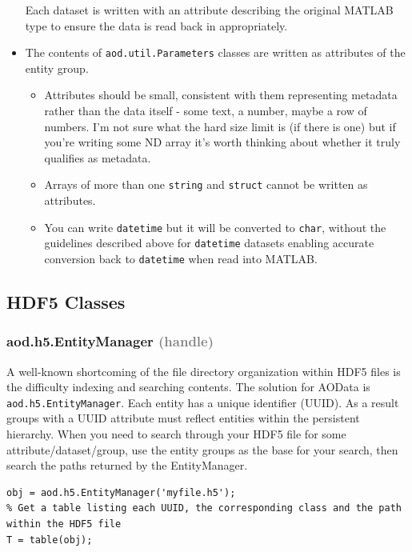 \documentclass[10pt]{exam}
\newcommand\myparent[1]{\textcolor{gray}{(#1)}}
\newcommand\aodclass[1]{\textcolor{codeblue}{\texttt{#1}}}
\newcommand\matclass[1]{\textcolor{codeblue}{\texttt{#1}}}
\begin{document}
\begin{itemize}
\begin{itemize}
			\end{itemize}
			Each dataset is written with an attribute describing the original MATLAB type to ensure the data is read back in appropriately.
			\item The contents of \aodclass{aod.util.Parameters} classes are written as attributes of the entity group.
			\begin{itemize}
				\item Attributes should be small, consistent with them representing metadata rather than the data itself - some text, a number, maybe a row of numbers. I'm not sure what the hard size limit is (if there is one) but if you're writing some ND array it's worth thinking about whether it truly qualifies as metadata.
				\item Arrays of more than one \matclass{string} and \matclass{struct} cannot be written as attributes.
				\item You can write \matclass{datetime} but it will be converted to \matclass{char}, without the guidelines described above for \matclass{datetime} datasets enabling accurate conversion back to \matclass{datetime} when read into MATLAB.
			\end{itemize}
		\end{itemize}

\subsection{HDF5 Classes}
	\subsubsection{aod.h5.EntityManager \myparent{handle}}\label{subsubsection:EntityManager}
		\noindent A well-known shortcoming of the file directory organization within HDF5 files is the difficulty indexing and searching contents. The solution for AOData is \aodclass{aod.h5.EntityManager}. Each entity has a unique identifier (UUID). As a result groups with a UUID attribute must reflect entities within the persistent hierarchy. When you need to search through your HDF5 file for some attribute/dataset/group, use the entity groups as the base for your search, then search the paths returned by the EntityManager.
	\begin{lstlisting}[style=matlab-editor, basicstyle=\mlttfamily\footnotesize]
obj = aod.h5.EntityManager('myfile.h5');
% Get a table listing each UUID, the corresponding class and the path within the HDF5 file
T = table(obj);
	\end{lstlisting}
\end{document}
